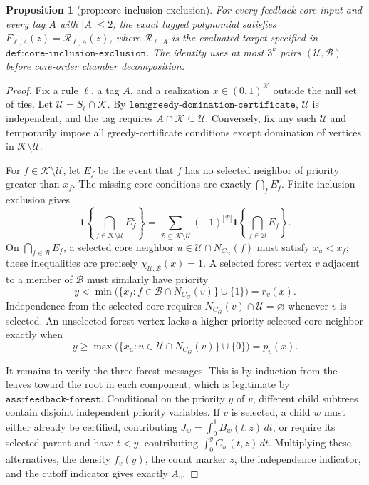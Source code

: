 \documentclass{article}
\newtheorem{proposition}{Proposition}
\begin{document}
\begin{proposition}[prop:core-inclusion-exclusion]\label{prop:core-inclusion-exclusion}
For every feedback-core input and every tag \(A\) with \(|A|\le2\), the exact tagged polynomial satisfies \(F_{\ell,A}(z)=\mathcal R_{\ell,A}(z)\), where \(\mathcal R_{\ell,A}\) is the evaluated target specified in \(\texttt{def:core-inclusion-exclusion}\). The identity uses at most \(3^k\) pairs \((\mathcal U,\mathcal B)\) before core-order chamber decomposition.
\end{proposition}
\begin{proof}
Fix a rule \(\ell\), a tag \(A\), and a realization \(x\in(0,1)^{\mathcal K}\) outside the null set of ties.  Let \(\mathcal U=S_\ell\cap\mathcal K\).  By \(\texttt{lem:greedy-domination-certificate}\), \(\mathcal U\) is independent, and the tag requires \(A\cap\mathcal K\subseteq\mathcal U\).  Conversely, fix any such \(\mathcal U\) and temporarily impose all greedy-certificate conditions except domination of vertices in \(\mathcal K\setminus\mathcal U\).

For \(f\in\mathcal K\setminus\mathcal U\), let \(E_f\) be the event that \(f\) has no selected neighbor of priority greater than \(x_f\).  The missing core conditions are exactly \(\bigcap_f E_f^{\mathsf c}\).  Finite inclusion--exclusion gives
\[
 \mathbf 1\!\left\{\bigcap_{f\in\mathcal K\setminus\mathcal U}E_f^{\mathsf c}\right\}
 =\sum_{\mathcal B\subseteq\mathcal K\setminus\mathcal U}(-1)^{|\mathcal B|}
   \mathbf 1\!\left\{\bigcap_{f\in\mathcal B}E_f\right\}.
\]
On \(\bigcap_{f\in\mathcal B}E_f\), a selected core neighbor \(u\in\mathcal U\cap N_{C_G}(f)\) must satisfy \(x_u<x_f\); these inequalities are precisely \(\chi_{\mathcal U,\mathcal B}(x)=1\).  A selected forest vertex \(v\) adjacent to a member of \(\mathcal B\) must similarly have priority
\[
 y<\min\bigl(\{x_f:f\in\mathcal B\cap N_{C_G}(v)\}\cup\{1\}\bigr)=r_v(x).
\]
Independence from the selected core requires \(N_{C_G}(v)\cap\mathcal U=\varnothing\) whenever \(v\) is selected.  An unselected forest vertex lacks a higher-priority selected core neighbor exactly when
\[
 y\ge \max\bigl(\{x_u:u\in\mathcal U\cap N_{C_G}(v)\}\cup\{0\}\bigr)=p_v(x).
\]

It remains to verify the three forest messages.  This is by induction from the leaves toward the root in each component, which is legitimate by \(\texttt{ass:feedback-forest}\).  Conditional on the priority \(y\) of \(v\), different child subtrees contain disjoint independent priority variables.  If \(v\) is selected, a child \(w\) must either already be certified, contributing \(J_w=\int_0^1B_w(t,z)\,dt\), or require its selected parent and have \(t<y\), contributing \(\int_0^yC_w(t,z)\,dt\).  Multiplying these alternatives, the density \(f_v(y)\), the count marker \(z\), the independence indicator, and the cutoff indicator gives exactly \(A_v\).


\end{proof}
\end{document}
